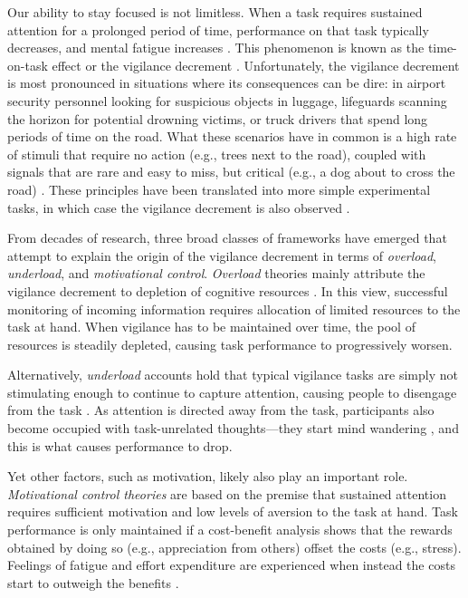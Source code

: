 \documentclass[11pt,english,]{memoir}
\begin{document}
Our ability to stay focused is not limitless. When a task requires sustained attention for a prolonged period of time, performance on that task typically decreases, and mental fatigue increases \autocite{Ackerman2011}. This phenomenon is known as the time-on-task effect or the vigilance decrement \autocite{Warm2008}. Unfortunately, the vigilance decrement is most pronounced in situations where its consequences can be dire: in airport security personnel looking for suspicious objects in luggage, lifeguards scanning the horizon for potential drowning victims, or truck drivers that spend long periods of time on the road. What these scenarios have in common is a high rate of stimuli that require no action (e.g., trees next to the road), coupled with signals that are rare and easy to miss, but critical (e.g., a dog about to cross the road) \autocite{Parasuraman1979}. These principles have been translated into more simple experimental tasks, in which case the vigilance decrement is also observed \autocites{Bartlett1943}{Mackworth1948}.

From decades of research, three broad classes of frameworks have emerged that attempt to explain the origin of the vigilance decrement in terms of \emph{overload}, \emph{underload}, and \emph{motivational control}. \emph{Overload} theories mainly attribute the vigilance decrement to depletion of cognitive resources \autocite{Helton2008}. In this view, successful monitoring of incoming information requires allocation of limited resources to the task at hand. When vigilance has to be maintained over time, the pool of resources is steadily depleted, causing task performance to progressively worsen.

Alternatively, \emph{underload} accounts hold that typical vigilance tasks are simply not stimulating enough to continue to capture attention, causing people to disengage from the task \autocites{Manly1999}{Robertson1997}. As attention is directed away from the task, participants also become occupied with task-unrelated thoughts---they start mind wandering \autocite{Smallwood2006}, and this is what causes performance to drop.

Yet other factors, such as motivation, likely also play an important role. \emph{Motivational control theories} \autocite{Hockey1997} are based on the premise that sustained attention requires sufficient motivation and low levels of aversion to the task at hand. Task performance is only maintained if a cost-benefit analysis shows that the rewards obtained by doing so (e.g., appreciation from others) offset the costs (e.g., stress). Feelings of fatigue and effort expenditure are experienced when instead the costs start to outweigh the benefits \autocite{Kurzban2013}.
\end{document}
